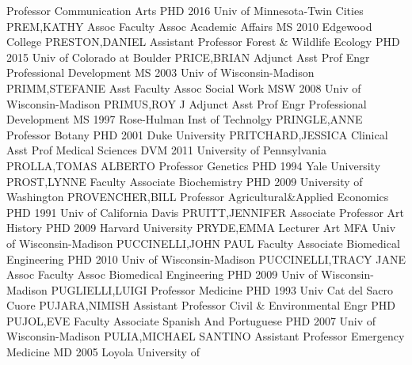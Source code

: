 \documentclass[
]{article}
\begin{document}
Professor \textbar Communication Arts \textbar PHD 2016 Univ of
Minnesota-Twin Cities \textbar PREM,KATHY \textbar{} 
\textbar Assoc Faculty Assoc \textbar Academic Affairs \textbar MS 2010
Edgewood College \textbar PRESTON,DANIEL \textbar{} 
\textbar Assistant Professor \textbar Forest \& Wildlife Ecology
\textbar PHD 2015 Univ of Colorado at Boulder \textbar PRICE,BRIAN
\textbar{}  \textbar Adjunct Asst Prof \textbar Engr
Professional Development \textbar MS 2003 Univ of Wisconsin-Madison
\textbar PRIMM,STEFANIE \textbar{}  \textbar Asst Faculty
Assoc \textbar Social Work \textbar MSW 2008 Univ of Wisconsin-Madison
\textbar PRIMUS,ROY J \textbar{}  \textbar Adjunct Asst Prof
\textbar Engr Professional Development \textbar MS 1997 Rose-Hulman Inst
of Technolgy \textbar PRINGLE,ANNE \textbar{} 
\textbar Professor \textbar Botany \textbar PHD 2001 Duke University
\textbar PRITCHARD,JESSICA \textbar{}  \textbar Clinical
Asst Prof \textbar Medical Sciences \textbar DVM 2011 University of
Pennsylvania \textbar PROLLA,TOMAS ALBERTO \textbar{} 
\textbar Professor \textbar Genetics \textbar PHD 1994 Yale University
\textbar PROST,LYNNE \textbar{}  \textbar Faculty Associate
\textbar Biochemistry \textbar PHD 2009 University of Washington
\textbar PROVENCHER,BILL \textbar{}  \textbar Professor
\textbar Agricultural\&Applied Economics \textbar PHD 1991 Univ of
California Davis \textbar PRUITT,JENNIFER \textbar{} 
\textbar Associate Professor \textbar Art History \textbar PHD 2009
Harvard University \textbar PRYDE,EMMA \textbar{} 
\textbar Lecturer \textbar Art \textbar MFA Univ of Wisconsin-Madison
\textbar PUCCINELLI,JOHN PAUL \textbar{}  \textbar Faculty
Associate \textbar Biomedical Engineering \textbar PHD 2010 Univ of
Wisconsin-Madison \textbar PUCCINELLI,TRACY JANE \textbar{} 
\textbar Assoc Faculty Assoc \textbar Biomedical Engineering
\textbar PHD 2009 Univ of Wisconsin-Madison \textbar PUGLIELLI,LUIGI
\textbar{}  \textbar Professor \textbar Medicine
\textbar PHD 1993 Univ Cat del Sacro Cuore \textbar PUJARA,NIMISH
\textbar{}  \textbar Assistant Professor \textbar Civil \&
Environmental Engr \textbar PHD \textbar PUJOL,EVE \textbar{}
 \textbar Faculty Associate \textbar Spanish And Portuguese
\textbar PHD 2007 Univ of Wisconsin-Madison \textbar PULIA,MICHAEL
SANTINO \textbar{}  \textbar Assistant Professor
\textbar Emergency Medicine \textbar MD 2005 Loyola University of
\end{document}
